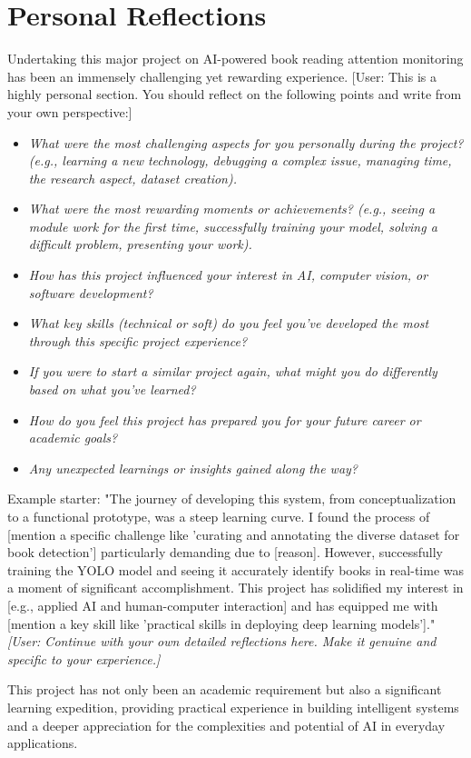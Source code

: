 \section{Personal Reflections }
Undertaking this major project on AI-powered book reading attention monitoring has been an immensely challenging yet rewarding experience. 
[User: This is a highly personal section. You should reflect on the following points and write from your own perspective:]
\begin{itemize}
    \item \textit{What were the most challenging aspects for you personally during the project? (e.g., learning a new technology, debugging a complex issue, managing time, the research aspect, dataset creation).}
    \item \textit{What were the most rewarding moments or achievements? (e.g., seeing a module work for the first time, successfully training your model, solving a difficult problem, presenting your work).}
    \item \textit{How has this project influenced your interest in AI, computer vision, or software development?}
    \item \textit{What key skills (technical or soft) do you feel you've developed the most through this specific project experience?}
    \item \textit{If you were to start a similar project again, what might you do differently based on what you've learned?}
    \item \textit{How do you feel this project has prepared you for your future career or academic goals?}
    \item \textit{Any unexpected learnings or insights gained along the way?}
\end{itemize}
Example starter: "The journey of developing this system, from conceptualization to a functional prototype, was a steep learning curve. I found the process of [mention a specific challenge like 'curating and annotating the diverse dataset for book detection'] particularly demanding due to [reason]. However, successfully training the YOLO model and seeing it accurately identify books in real-time was a moment of significant accomplishment. This project has solidified my interest in [e.g., applied AI and human-computer interaction] and has equipped me with [mention a key skill like 'practical skills in deploying deep learning models']." 
\textit{[User: Continue with your own detailed reflections here. Make it genuine and specific to your experience.]}

This project has not only been an academic requirement but also a significant learning expedition, providing practical experience in building intelligent systems and a deeper appreciation for the complexities and potential of AI in everyday applications.